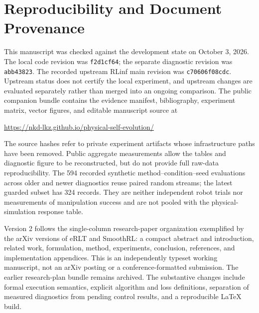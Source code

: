 \documentclass[10pt,letterpaper]{article}
\begin{document}
\section{Reproducibility and Document Provenance}
\label{app:provenance}
This manuscript was checked against the development state on October 3, 2026. The local code revision was \texttt{f2d1cf64}; the separate diagnostic revision was \texttt{abb43823}. The recorded upstream RLinf main revision was \texttt{c70606f08cdc}. Upstream status does not certify the local experiment, and upstream changes are evaluated separately rather than merged into an ongoing comparison. The public companion bundle contains the evidence manifest, bibliography, experiment matrix, vector figures, and editable manuscript source at
\begin{center}\small
\url{https://nkd-lkz.github.io/physical-self-evolution/}
\end{center}
The source hashes refer to private experiment artifacts whose infrastructure paths have been removed. Public aggregate measurements allow the tables and diagnostic figure to be reconstructed, but do not provide full raw-data reproducibility. The 594 recorded synthetic method--condition--seed evaluations across older and newer diagnostics reuse paired random streams; the latest guarded subset has 324 records. They are neither independent robot trials nor measurements of manipulation success and are not pooled with the physical-simulation response table.

Version 2 follows the single-column research-paper organization exemplified by the arXiv versions of eRLT and SmoothRL: a compact abstract and introduction, related work, formulation, method, experiments, conclusion, references, and implementation appendices. This is an independently typeset working manuscript, not an arXiv posting or a conference-formatted submission. The earlier research-plan bundle remains archived. The substantive changes include formal execution semantics, explicit algorithm and loss definitions, separation of measured diagnostics from pending control results, and a reproducible LaTeX build.
\end{document}

